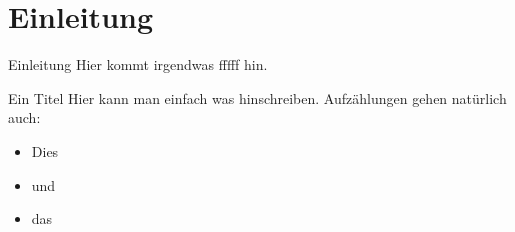 \section{Einleitung}

\begin{frame}{Einleitung}
    Hier kommt irgendwas fffff hin.
\end{frame}

\begin{frame}{Ein Titel}
    Hier kann man einfach was hinschreiben.
    Aufz\"ahlungen gehen nat\"urlich auch:
    \begin{itemize}
        \item Dies
        \item und
        \item das
    \end{itemize}
\end{frame}